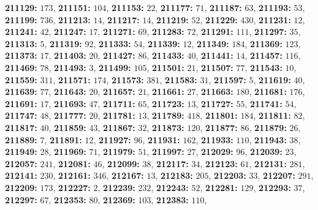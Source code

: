 \textsf{\bfseries 211129:} $173$, \textsf{\bfseries 211151:} $104$, \textsf{\bfseries 211153:} $22$, \textsf{\bfseries 211177:} $71$, \textsf{\bfseries 211187:} $63$, \textsf{\bfseries 211193:} $53$, \textsf{\bfseries 211199:} $736$, \textsf{\bfseries 211213:} $14$, \textsf{\bfseries 211217:} $14$, \textsf{\bfseries 211219:} $52$, \textsf{\bfseries 211229:} $430$, \textsf{\bfseries 211231:} $12$, \textsf{\bfseries 211241:} $42$, \textsf{\bfseries 211247:} $17$, \textsf{\bfseries 211271:} $69$, \textsf{\bfseries 211283:} $72$, \textsf{\bfseries 211291:} $111$, \textsf{\bfseries 211297:} $35$, \textsf{\bfseries 211313:} $5$, \textsf{\bfseries 211319:} $92$, \textsf{\bfseries 211333:} $54$, \textsf{\bfseries 211339:} $12$, \textsf{\bfseries 211349:} $184$, \textsf{\bfseries 211369:} $123$, \textsf{\bfseries 211373:} $17$, \textsf{\bfseries 211403:} $20$, \textsf{\bfseries 211427:} $86$, \textsf{\bfseries 211433:} $40$, \textsf{\bfseries 211441:} $14$, \textsf{\bfseries 211457:} $116$, \textsf{\bfseries 211469:} $78$, \textsf{\bfseries 211493:} $3$, \textsf{\bfseries 211499:} $105$, \textsf{\bfseries 211501:} $21$, \textsf{\bfseries 211507:} $77$, \textsf{\bfseries 211543:} $10$, \textsf{\bfseries 211559:} $311$, \textsf{\bfseries 211571:} $174$, \textsf{\bfseries 211573:} $381$, \textsf{\bfseries 211583:} $31$, \textsf{\bfseries 211597:} $5$, \textsf{\bfseries 211619:} $40$, \textsf{\bfseries 211639:} $77$, \textsf{\bfseries 211643:} $20$, \textsf{\bfseries 211657:} $21$, \textsf{\bfseries 211661:} $27$, \textsf{\bfseries 211663:} $180$, \textsf{\bfseries 211681:} $176$, \textsf{\bfseries 211691:} $17$, \textsf{\bfseries 211693:} $47$, \textsf{\bfseries 211711:} $65$, \textsf{\bfseries 211723:} $13$, \textsf{\bfseries 211727:} $55$, \textsf{\bfseries 211741:} $54$, \textsf{\bfseries 211747:} $48$, \textsf{\bfseries 211777:} $20$, \textsf{\bfseries 211781:} $13$, \textsf{\bfseries 211789:} $418$, \textsf{\bfseries 211801:} $184$, \textsf{\bfseries 211811:} $82$, \textsf{\bfseries 211817:} $40$, \textsf{\bfseries 211859:} $43$, \textsf{\bfseries 211867:} $32$, \textsf{\bfseries 211873:} $120$, \textsf{\bfseries 211877:} $86$, \textsf{\bfseries 211879:} $26$, \textsf{\bfseries 211889:} $7$, \textsf{\bfseries 211891:} $12$, \textsf{\bfseries 211927:} $96$, \textsf{\bfseries 211931:} $162$, \textsf{\bfseries 211933:} $110$, \textsf{\bfseries 211943:} $38$, \textsf{\bfseries 211949:} $28$, \textsf{\bfseries 211969:} $71$, \textsf{\bfseries 211979:} $51$, \textsf{\bfseries 211997:} $27$, \textsf{\bfseries 212029:} $96$, \textsf{\bfseries 212039:} $23$, \textsf{\bfseries 212057:} $241$, \textsf{\bfseries 212081:} $46$, \textsf{\bfseries 212099:} $38$, \textsf{\bfseries 212117:} $34$, \textsf{\bfseries 212123:} $61$, \textsf{\bfseries 212131:} $281$, \textsf{\bfseries 212141:} $230$, \textsf{\bfseries 212161:} $346$, \textsf{\bfseries 212167:} $13$, \textsf{\bfseries 212183:} $205$, \textsf{\bfseries 212203:} $33$, \textsf{\bfseries 212207:} $291$, \textsf{\bfseries 212209:} $173$, \textsf{\bfseries 212227:} $2$, \textsf{\bfseries 212239:} $232$, \textsf{\bfseries 212243:} $52$, \textsf{\bfseries 212281:} $129$, \textsf{\bfseries 212293:} $37$, \textsf{\bfseries 212297:} $67$, \textsf{\bfseries 212353:} $80$, \textsf{\bfseries 212369:} $103$, \textsf{\bfseries 212383:} $110$, 
